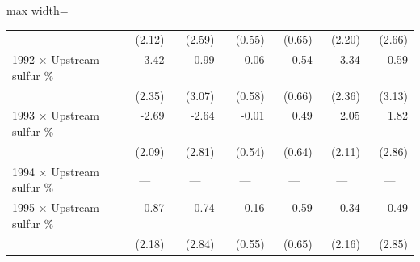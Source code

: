 \begin{table}[htbp]
{\begin{adjustbox}{max width=\linewidth}
\begin{tabular}{lrrrrrr}
 & (\phantom{-}2.12)\phantom{$^{***}$} & (\phantom{-}2.59)\phantom{$^{***}$} & (\phantom{-}0.55)\phantom{$^{***}$} & (\phantom{-}0.65)\phantom{$^{***}$} & (\phantom{-}2.20)\phantom{$^{***}$} & (\phantom{-}2.66)\phantom{$^{***}$} \\
1992 $\times$ Upstream sulfur \% & \phantom{(}-3.42$^{\phantom{*}\phantom{*}\phantom{*}}$ & \phantom{(}-0.99$^{\phantom{*}\phantom{*}\phantom{*}}$ & \phantom{(}-0.06$^{\phantom{*}\phantom{*}\phantom{*}}$ & \phantom{(}\phantom{-}0.54$^{\phantom{*}\phantom{*}\phantom{*}}$ & \phantom{(}\phantom{-}3.34$^{\phantom{*}\phantom{*}\phantom{*}}$ & \phantom{(}\phantom{-}0.59$^{\phantom{*}\phantom{*}\phantom{*}}$ \\
 & (\phantom{-}2.35)\phantom{$^{***}$} & (\phantom{-}3.07)\phantom{$^{***}$} & (\phantom{-}0.58)\phantom{$^{***}$} & (\phantom{-}0.66)\phantom{$^{***}$} & (\phantom{-}2.36)\phantom{$^{***}$} & (\phantom{-}3.13)\phantom{$^{***}$} \\
1993 $\times$ Upstream sulfur \% & \phantom{(}-2.69$^{\phantom{*}\phantom{*}\phantom{*}}$ & \phantom{(}-2.64$^{\phantom{*}\phantom{*}\phantom{*}}$ & \phantom{(}-0.01$^{\phantom{*}\phantom{*}\phantom{*}}$ & \phantom{(}\phantom{-}0.49$^{\phantom{*}\phantom{*}\phantom{*}}$ & \phantom{(}\phantom{-}2.05$^{\phantom{*}\phantom{*}\phantom{*}}$ & \phantom{(}\phantom{-}1.82$^{\phantom{*}\phantom{*}\phantom{*}}$ \\
 & (\phantom{-}2.09)\phantom{$^{***}$} & (\phantom{-}2.81)\phantom{$^{***}$} & (\phantom{-}0.54)\phantom{$^{***}$} & (\phantom{-}0.64)\phantom{$^{***}$} & (\phantom{-}2.11)\phantom{$^{***}$} & (\phantom{-}2.86)\phantom{$^{***}$} \\
1994 $\times$ Upstream sulfur \% & \multicolumn{1}{c}{---} & \multicolumn{1}{c}{---} & \multicolumn{1}{c}{---} & \multicolumn{1}{c}{---} & \multicolumn{1}{c}{---} & \multicolumn{1}{c}{---} \\
1995 $\times$ Upstream sulfur \% & \phantom{(}-0.87$^{\phantom{*}\phantom{*}\phantom{*}}$ & \phantom{(}-0.74$^{\phantom{*}\phantom{*}\phantom{*}}$ & \phantom{(}\phantom{-}0.16$^{\phantom{*}\phantom{*}\phantom{*}}$ & \phantom{(}\phantom{-}0.59$^{\phantom{*}\phantom{*}\phantom{*}}$ & \phantom{(}\phantom{-}0.34$^{\phantom{*}\phantom{*}\phantom{*}}$ & \phantom{(}\phantom{-}0.49$^{\phantom{*}\phantom{*}\phantom{*}}$ \\
 & (\phantom{-}2.18)\phantom{$^{***}$} & (\phantom{-}2.84)\phantom{$^{***}$} & (\phantom{-}0.55)\phantom{$^{***}$} & (\phantom{-}0.65)\phantom{$^{***}$} & (\phantom{-}2.16)\phantom{$^{***}$} & (\phantom{-}2.85)\phantom{$^{***}$} \\

\end{tabular}
\end{adjustbox}}
\end{table}
